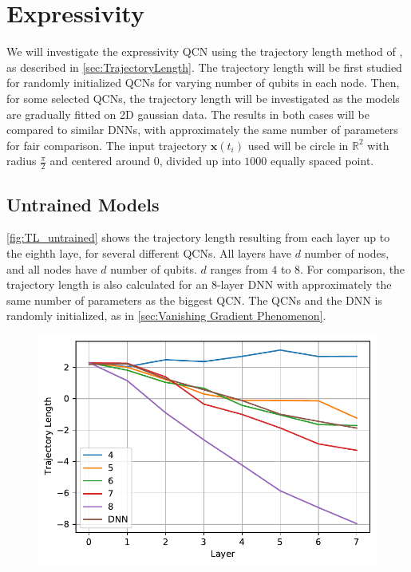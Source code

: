 \section{Expressivity}\label{sec:Expressivity}
We will investigate the expressivity QCN using the trajectory length method of \citet{raghu2017expressive}, as described in \autoref{sec:TrajectoryLength}. The trajectory length will be first studied for randomly initialized QCNs for varying number of qubits in each node. Then, for some selected QCNs, the trajectory length will be investigated as the models are gradually fitted on 2D gaussian data. The results in both cases will be compared to similar DNNs, with approximately the same number of parameters for fair comparison. The input trajectory $\boldsymbol{x}(t_i)$ used will be circle in $\mathbb{R}^2$ with radius $\frac{\pi}{2}$ and centered around $0$, divided up into $1000$ equally spaced point.

\subsection{Untrained Models}\label{sec:Untrained Models}

\autoref{fig:TL_untrained} shows the trajectory length resulting from each layer up to the eighth laye, for several different QCNs. All layers have $d$ number of nodes, and all nodes have $d$ number of qubits. $d$ ranges from $4$ to $8$. For comparison, the trajectory length is also calculated for an 8-layer DNN with approximately the same number of parameters as the biggest QCN. The QCNs and the DNN is randomly initialized, as in \autoref{sec:Vanishing Gradient Phenomenon}.

\begin{figure}[htp]
    \centering
    \includegraphics[width=12cm]{latex/figures/TL_untrained.pdf}
    \caption{}
    \label{fig:TL_untrained}
\end{figure}

